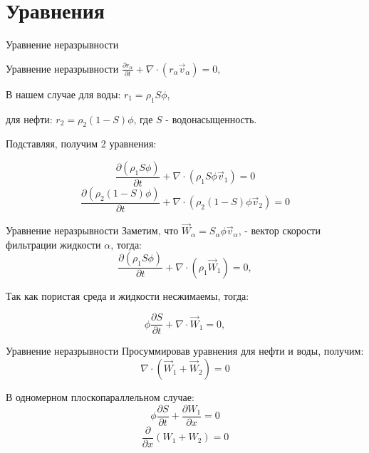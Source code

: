 \documentclass[14pt, aspectratio=169]{beamer}
\begin{document}
\section{Уравнения}

\begin{frame} {Уравнение неразрывности}

    \begin{block}{Уравнение неразрывности}
    $
    \frac{\partial r_{\alpha} }{\partial t} + \nabla \cdot \left( r_{\alpha} \vec{v}_{\alpha} \right) = 0,
    $
    \end{block}

    В нашем случае для воды:
    $
    r_1 = \rho_{1} S \phi 
    $,

    для нефти: $
    r_2 = \rho_{2} (1 - S) \phi 
    $,
    где $S$ - водонасыщенность.

    Подставляя, получим 2 уравнения:
    
    $$
    \frac{\partial ( \rho_{1} S \phi ) }{\partial t} + \nabla \cdot \left( \rho_{1} S \phi \vec{v}_{1} \right) = 0
    $$
    $$
    \frac{\partial \left( \rho_{2} (1 - S) \phi \right) }{\partial t} + \nabla \cdot \left( \rho_{2} (1 - S) \phi \vec{v}_{2} \right) = 0
    $$

\end{frame}

\begin{frame}{Уравнение неразрывности}
    Заметим, что $\vec{W}_{\alpha} = S_{\alpha} \phi \vec{v}_{\alpha}$, - вектор скорости фильтрации жидкости $\alpha$, тогда:
    $$
    \frac{\partial ( \rho_{1} S \phi ) }{\partial t} + \nabla \cdot \left( \rho_{1} \vec{W}_{1} \right) = 0,
    $$

    Так как пористая среда и жидкости несжимаемы, тогда:
    
    $$
    \phi \frac{\partial S }{\partial t} + \nabla \cdot \vec{W}_{1} = 0, $$ 
    
\end{frame}

\begin{frame}{Уравнение неразрывности}
    Просуммировав уравнения для нефти и воды, получим:
    $$
    \nabla \cdot \left( \vec{W}_{1} + \vec{W}_{2} \right)= 0
    $$

    В одномерном плоскопараллельном случае:
    $$
    \phi \frac{\partial S }{\partial t} + \frac{\partial W_{1}}{\partial x} = 0
    $$
    $$
    \frac{\partial}{\partial x} \left( W_1 + W_2 \right) = 0
    $$
    
\end{frame}
\end{document}
